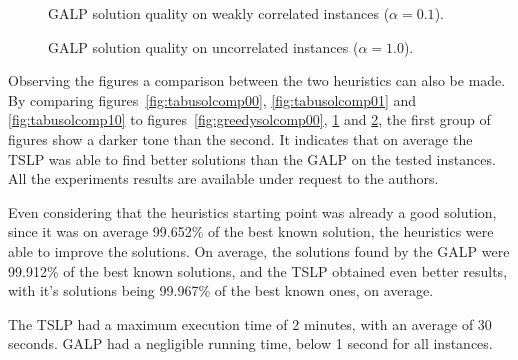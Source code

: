 \figspaces
\begin{figure}[H]
  \centering
  \resizebox{\columnwidth}{!}{%
    \subfloat[1 resource]{} 
    \subfloat[2 resources]{}
    \subfloat[4 resources]{}
  }
  \caption{GALP solution quality on weakly correlated instances ($\alpha = 0.1$).}
  \label{fig:greedysolcomp01}
\end{figure}

\figspaces
\begin{figure}[H]
  \centering
  \resizebox{\columnwidth}{!}{%
    \subfloat[1 resource]{} 
    \subfloat[2 resources]{}
    \subfloat[4 resources]{}
  }
  \caption{GALP solution quality on uncorrelated instances ($\alpha = 1.0$).}
  \label{fig:greedysolcomp10}
\end{figure}

Observing the figures a comparison between the two heuristics can also be made.
By comparing figures~\ref{fig:tabusolcomp00}, \ref{fig:tabusolcomp01} and \ref{fig:tabusolcomp10} to 
figures~\ref{fig:greedysolcomp00}, \ref{fig:greedysolcomp01} and \ref{fig:greedysolcomp10}, the first group 
of figures show a darker tone than the second. It indicates that on average the TSLP was able to find better
solutions than the GALP on the tested instances. All the experiments results are available under request to the authors.

Even considering that the heuristics starting point was already a good solution, since it was on average
99.652\% of the best known solution, the heuristics were able to improve the solutions. On average, 
the solutions found by the GALP were 99.912\% of the best known solutions, and the TSLP obtained 
even better results, with it's solutions being 99.967\% of the best known ones, on average.

The TSLP had a maximum execution time of 2 minutes, with an average of 30 seconds.
GALP had a negligible running time, below 1 second for all instances.
